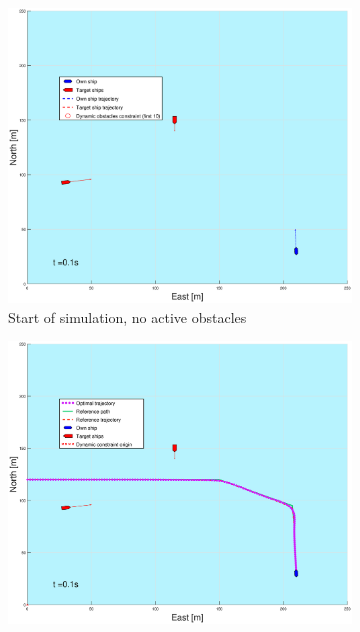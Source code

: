 \begin{figure}[b] %
    \begin{subfigure}{0.49\textwidth}
        \centering
        \includegraphics[width=\textwidth]{Images/Figures/Extra_Stuff/BlockedPath_Pos_t=1}
        \caption{Start of simulation, no active obstacles}
    \end{subfigure}
    \begin{subfigure}{0.499\textwidth}
        \centering
        \includegraphics[width=\textwidth]{Images/Figures/Extra_Stuff/BlockedPath_Wopt_t=1}

\end{subfigure}
\end{figure}
